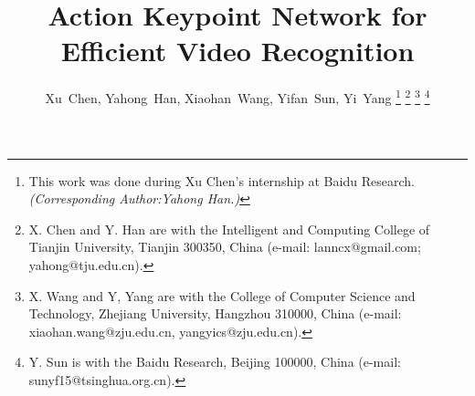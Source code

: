 \documentclass[journal]{IEEEtran}
\begin{document}
\title{Action Keypoint Network for Efficient Video Recognition}

\author{Xu~Chen, Yahong~Han, Xiaohan~Wang, Yifan~Sun, Yi~Yang 
	\thanks{This work was done during Xu Chen's internship at Baidu Research. \textit{(Corresponding Author:Yahong Han.)}} 
	\thanks{X. Chen and Y. Han are with the Intelligent and Computing College of Tianjin University, Tianjin 300350, China (e-mail: lanncx@gmail.com; yahong@tju.edu.cn).} 
	\thanks{X. Wang and Y, Yang are with the College of Computer Science and Technology, Zhejiang University, Hangzhou 310000, China (e-mail: xiaohan.wang@zju.edu.cn, yangyics@zju.edu.cn).} 
	\thanks{Y. Sun is with the Baidu Research, Beijing 100000, China (e-mail: sunyf15@tsinghua.org.cn).}
}



\maketitle
\end{document}
